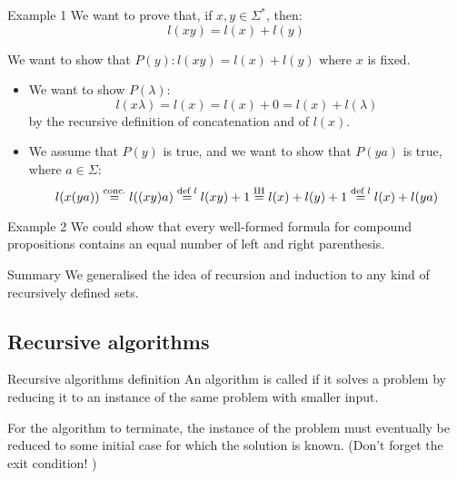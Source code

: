\documentclass[a4paper]{article}
\begin{document}
\begin{parag}{Example 1}
    We want to prove that, if $x, y \in \Sigma^*$, then: 
    \[l\left(xy\right) = l\left(x\right) + l\left(y\right)\]
    
    
    We want to show that $P\left(y\right): l\left(xy\right)= l\left(x\right) + l\left(y\right)$ where $x$ is fixed. 
    \begin{itemize}
        \item {} We want to show $P\left(\lambda\right)$:
            \[l\left(x \lambda\right) = l\left(x\right) = l\left(x\right) + 0 = l\left(x\right) + l\left(\lambda\right) \]
            by the recursive definition of concatenation and of $l\left(x\right)$.
         
        \item {} We assume that $P\left(y\right)$ is true, and we want to show that $P\left(ya\right)$ is true, where $a \in \Sigma$: 
            \[l\left(x\left(ya\right)\right) \over{=}{conc.} l\left(\left(xy\right)a\right) \over{=}{def $l$} l\left(xy\right) + 1 \over{=}{IH} l\left(x\right) + l\left(y\right) + 1 \over{=}{def $l$} l\left(x\right) + l\left(ya\right)\]
        
    \end{itemize}
\end{parag}

\begin{parag}{Example 2}
    We could show that every well-formed formula for compound propositions contains an equal number of left and right parenthesis.
\end{parag}

\begin{parag}{Summary}
    We generalised the idea of recursion and induction to any kind of recursively defined sets.

\end{parag}

\subsection{Recursive algorithms}

\begin{parag}{Recursive algorithms definition}
    An algorithm is called  if it solves a problem by reducing it to an instance of the same problem with smaller input.

    For the algorithm to terminate, the instance of the problem must eventually be reduced to some initial case for which the solution is known. (Don't forget the exit condition! \wink)
\end{parag}
\end{document}
